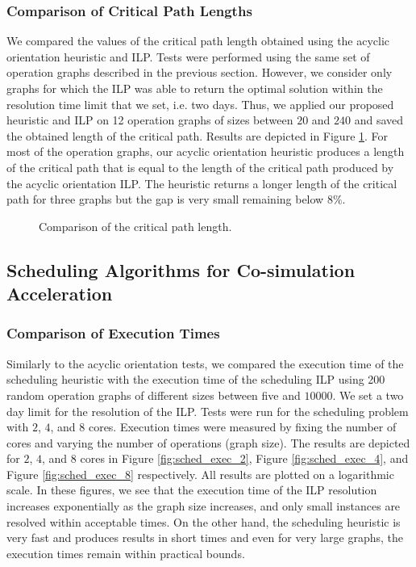 \subsubsection{Comparison of Critical Path Lengths}

We compared the values of the critical path length obtained using the acyclic orientation heuristic and ILP. Tests were performed using the same set of operation graphs described in the previous section. However, we consider only graphs for which the ILP was able to return the optimal solution within the resolution time limit that we set, i.e. two days. Thus, we applied our proposed heuristic and ILP on 12 operation graphs of sizes between $20$ and $240$ and saved the obtained length of the critical path. Results are depicted in Figure \ref{fig:orient_critpath}. For most of the operation graphs, our acyclic orientation heuristic produces a length of the critical path that is equal to the length of the critical path produced by the acyclic orientation ILP. The heuristic returns a longer length of the critical path for three graphs but the gap is very small remaining below $8\%$.  

\begin{figure}[phbt]
\centering

\caption{Comparison of the critical path length.}
\label{fig:orient_critpath}
\end{figure}


\subsection{Scheduling Algorithms for Co-simulation Acceleration}

\subsubsection{Comparison of Execution Times}

Similarly to the acyclic orientation tests, we compared the execution time of the scheduling heuristic with the execution time of the scheduling ILP using 200 random operation graphs of different sizes between five and $10000$. We set a two day limit for the resolution of the ILP. Tests were run for the scheduling problem with $2$, $4$, and $8$ cores. Execution times were measured by fixing the number of cores and varying the number of operations (graph size). The results are depicted for $2$, $4$, and $8$ cores in Figure \ref{fig:sched_exec_2}, Figure \ref{fig:sched_exec_4}, and Figure \ref{fig:sched_exec_8} respectively. All results are plotted on a logarithmic scale. In these figures, we see that the execution time of the ILP resolution increases exponentially as the graph size increases, and only small instances are resolved within acceptable times. On the other hand, the scheduling heuristic is very fast and produces results in short times and even for very large graphs, the execution times remain within practical bounds.

